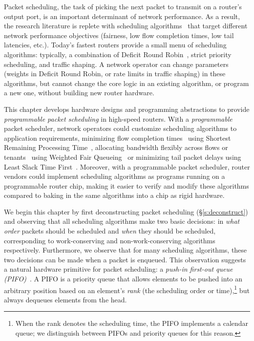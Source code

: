 Packet scheduling, the task of picking the next packet to transmit on a
router's output port, is an important determinant of network performance. As a
result, the research literature is replete with scheduling
algorithms~\cite{wfq, srr, lstf, drr, pFabric} that target different network
performance objectives (\eg fairness, low flow completion times, low tail
latencies, etc.).  Today's fastest routers provide a small menu of scheduling
algorithms: typically, a combination of Deficit Round Robin~\cite{drr}, strict
priority scheduling, and traffic shaping. A network operator can change
parameters (\eg weights in Deficit Round Robin, or rate limits in traffic
shaping) in these algorithms, but cannot change the core logic in an existing
algorithm, or program a new one, without building new router hardware.

 This chapter develops hardware designs and programming abstractions to provide
{\em programmable packet scheduling} in high-speed routers. With a {\em
programmable} packet scheduler, network operators could customize scheduling
algorithms to application requirements, \eg minimizing flow completion
times~\cite{pFabric} using Shortest Remaining Processing Time~\cite{srpt},
allocating bandwidth flexibly across flows or tenants~\cite{eyeq, faircloud}
using Weighted Fair Queueing~\cite{wfq} or minimizing tail packet delays using
Least Slack Time First~\cite{lstf}.  Moreover, with a programmable packet
scheduler, router vendors could implement scheduling algorithms as programs
running on a programmable router chip, making it easier to verify and modify
these algorithms compared to baking in the same algorithms into a chip as rigid
hardware.

We begin this chapter by first deconstructing packet scheduling
(\S\ref{s:deconstruct}) and observing that all scheduling algorithms make two
basic decisions: in {\em what order} packets should be scheduled and {\em when}
they should be scheduled, corresponding to work-conserving and
non-work-conserving algorithms respectively.  Furthermore, we observe that for
many scheduling algorithms, these two decisions can be made when a packet is
enqueued. This observation suggests a natural hardware primitive for packet
scheduling: a {\em push-in first-out queue (PIFO)}~\cite{pifo}. A PIFO is a
priority queue that allows elements to be pushed into an arbitrary position
based on an element's {\em rank} (the scheduling order or
time),\footnote{When the rank denotes the scheduling time, the PIFO
implements a calendar queue; we distinguish between PIFOs and priority queues
for this reason.} but always dequeues elements from the head.

